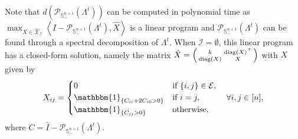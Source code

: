 \documentclass[11pt, a4paper]{article}
\newcommand{\diag}[1]{{\text{diag}\left(#1\right)}}
\newcommand{\IP}[2]{\left\langle #1, #2 \right\rangle}
\newcommand{\mc}{\mathcal}
\newcommand{\aug}[1]{\hat{#1}}
\begin{document}
Note that $d(\mc{P}_{\mathbb{S}^{n+1}_{-}}(\Lambda^t))$ can be computed in polynomial time as $\max_{\aug{X} \in \aug{\mc{X}}_\mc{I}} \IP{\aug{I}-\mc{P}_{\mathbb{S}^{n+1}_{-}}(\Lambda^t)}{\aug{X}}$ is a linear program and $\mc{P}_{\mathbb{S}^{n+1}_{-}}(\Lambda^t)$ can be found through a spectral decomposition of $\Lambda^t$. When $\mc{I} = \emptyset$, this linear program has a closed-form solution, namely the matrix $\aug{X} = \begin{psmallmatrix} k & \diag{X}^\top \\ \diag{X} & X\end{psmallmatrix}$ with $X$ given by
\begin{equation} 
        X_{ij} = 
        \begin{cases}
            0 &\text{if } \{i,j\} \in \mc{E}, \\
            \mathbbm{1}_{\{C_{ii} + 2C_{i0} > 0\}} &\text{if } i=j, \\
            \mathbbm{1}_{\{C_{ij} > 0\}} &\text{otherwise,}
        \end{cases} \quad\forall i, j \in [n],
\end{equation}
where $C = \aug{I}-\mc{P}_{\mathbb{S}^{n+1}_{-}}(\Lambda^t)$.
\end{document}
